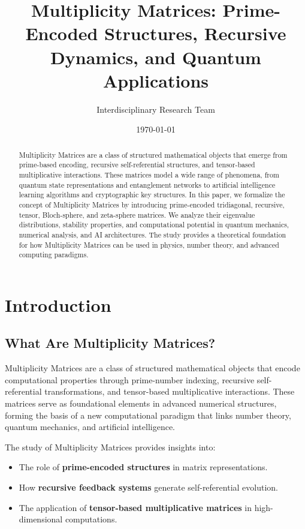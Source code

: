 \documentclass{article}
\title{Multiplicity Matrices: Prime-Encoded Structures, Recursive Dynamics, and Quantum Applications}
\author{Interdisciplinary Research Team}
\affil{Citizen Gardens - The Foundation of Multiplicity\\info@citizengardens.org}
\date{\today}
\theoremstyle{plain}
\begin{document}
\maketitle

\begin{abstract}
Multiplicity Matrices are a class of structured mathematical objects that emerge from prime-based encoding, recursive self-referential structures, and tensor-based multiplicative interactions. These matrices model a wide range of phenomena, from quantum state representations and entanglement networks to artificial intelligence learning algorithms and cryptographic key structures. In this paper, we formalize the concept of Multiplicity Matrices by introducing prime-encoded tridiagonal, recursive, tensor, Bloch-sphere, and zeta-sphere matrices. We analyze their eigenvalue distributions, stability properties, and computational potential in quantum mechanics, numerical analysis, and AI architectures. The study provides a theoretical foundation for how Multiplicity Matrices can be used in physics, number theory, and advanced computing paradigms.
\end{abstract}

\section{Introduction}

\subsection{What Are Multiplicity Matrices?}

Multiplicity Matrices are a class of structured mathematical objects that encode computational properties through prime-number indexing, recursive self-referential transformations, and tensor-based multiplicative interactions. These matrices serve as foundational elements in advanced numerical structures, forming the basis of a new computational paradigm that links number theory, quantum mechanics, and artificial intelligence.

The study of Multiplicity Matrices provides insights into:
\begin{itemize}
    \item The role of \textbf{prime-encoded structures} in matrix representations.
    \item How \textbf{recursive feedback systems} generate self-referential evolution.
    \item The application of \textbf{tensor-based multiplicative matrices} in high-dimensional computations.
\end{itemize}
\end{document}
